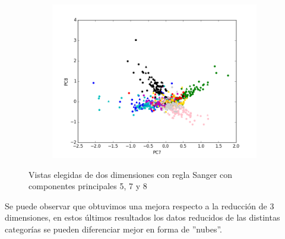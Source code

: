 \begin{figure}[ht!]
\begin{subfigure}[b]{0.5\textwidth}
		\includegraphics[width=\linewidth]{img/sanger/9dim-pc7-pc8.png}
	\end{subfigure}%
	\caption{Vistas elegidas de dos dimensiones con regla Sanger con componentes principales 5, 7 y 8}
\end{figure}


Se puede observar que obtuvimos una mejora respecto a la reducción de 3 dimensiones, en estos últimos resultados los datos reducidos de las distintas categorías se pueden diferenciar mejor en forma de ''nubes''.










